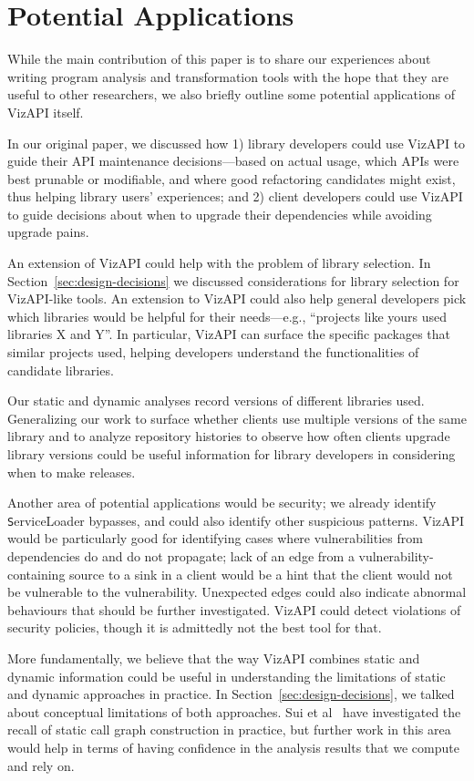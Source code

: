 \section{Potential Applications}
\label{sec:potential-applications}
While the main contribution of this paper is to share our experiences
about writing program analysis and transformation tools with the hope
that they are useful to other researchers, we also briefly outline
some potential applications of VizAPI itself.

In our original paper, we discussed how 1) library developers could
use VizAPI to guide their API maintenance decisions---based on actual
usage, which APIs were best prunable or modifiable, and where good
refactoring candidates might exist, thus helping library users'
experiences; and 2) client developers could use VizAPI to guide
decisions about when to upgrade their dependencies while avoiding
upgrade pains.

An extension of VizAPI could help with the problem of library selection. In
Section~\ref{sec:design-decisions} we discussed considerations for library
selection for VizAPI-like tools. An extension to VizAPI could also help
general developers pick which libraries would be helpful for their
needs---e.g., ``projects like yours used libraries X and Y''. In particular,
VizAPI can surface the specific packages that similar projects used,
helping developers understand the functionalities of candidate libraries.

Our static and dynamic analyses record versions of different libraries used. 
Generalizing our work to surface whether clients use multiple versions of the same library and
to analyze repository histories to observe how often clients upgrade library versions 
could be useful information for library developers in considering when to make releases.

Another area of potential applications would be security; we already
identify {\texttt ServiceLoader} bypasses, and could also identify
other suspicious patterns. VizAPI would be particularly good for
identifying cases where vulnerabilities from dependencies do and do
not propagate; lack of an edge from a vulnerability-containing source
to a sink in a client would be a hint that the client would not be
vulnerable to the vulnerability. Unexpected edges could also indicate
abnormal behaviours that should be further investigated.
VizAPI could detect violations of
security policies, though it is admittedly not the best tool for that.

More fundamentally, we believe that the way VizAPI combines static and
dynamic information could be useful in understanding the limitations
of static and dynamic approaches in practice. In
Section~\ref{sec:design-decisions}, we talked about conceptual
limitations of both approaches. Sui et
al~\cite{sui20:_recal_static_call_graph_const_pract} have investigated
the recall of static call graph construction in practice, but further
work in this area would help in terms of having confidence in the
analysis results that we compute and rely on.

